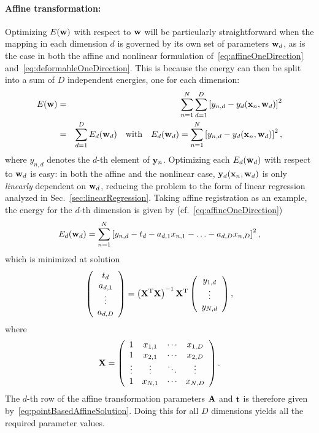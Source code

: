 \documentclass[10pt,twoside]{book}
\begin{document}
\paragraph{Affine transformation:}
%
Optimizing $E(\mathbf{w})$ with respect to $\mathbf{w}$ will be particularly straightforward when the mapping in each dimension $d$ is governed by its own set of parameters $\mathbf{w}_d$,
as is the case in both the affine and nonlinear formulation of~\eqref{eq:affineOneDirection} and~\eqref{eq:deformableOneDirection}.
This is because the energy can then be split into a sum of $D$ independent energies, one for each dimension: 
\begin{eqnarray*}
E( \mathbf{w} ) 
& = & 
\sum_{n=1}^N 
\sum_{d=1}^D
\left[ y_{n,d} - y_d( \mathbf{x}_n, \mathbf{w}_d ) \right]^2 
\\
& = & 
\sum_{d=1}^D E_d( \mathbf{w}_d )
\quad
\text{with}
\quad
E_d( \mathbf{w}_d )
=
\sum_{n=1}^N 
\left[ y_{n,d} - y_d( \mathbf{x}_n, \mathbf{w}_d ) \right]^2
,
\end{eqnarray*}
where $y_{n,d}$ denotes the $d$-th element of $\mathbf{y}_n$.
%
Optimizing each $E_d(\mathbf{w}_d)$ with respect to $\mathbf{w}_d$ is easy: 
in both the affine and the nonlinear case, 
$\mathbf{y}_d( \mathbf{x}_n, \mathbf{w}_d )$ is only \emph{linearly} dependent on $\mathbf{w}_d$,
reducing the problem to the form of linear regression analyzed in Sec.~\ref{sec:linearRegression}.
%
Taking affine registration as an example, the energy for the $d$-th dimension is given by (cf.~\eqref{eq:affineOneDirection}) 
$$
E_d(\mathbf{w}_d) = 
\sum_{n=1}^N 
\left[ y_{n,d} - t_d - a_{d,1} x_{n,1} - \ldots - a_{d,D} x_{n,D} \right]^2
,
$$
which is minimized at solution
\begin{equation}
\left( 
\begin{array}{c}
t_d \\
a_{d,1} \\
\vdots \\
a_{d,D}
\end{array}
\right)
=
\left( \mathbf{X}^\mathrm{T} \mathbf{X} \right)^{-1} \mathbf{X}^\mathrm{T} 
\left(
\begin{array}{c}
y_{1,d} \\
\vdots \\
y_{N,d}
\end{array}
\right)
,
\label{eq:pointBasedAffineSolution}
\end{equation}
where
$$
\mathbf{X} =
\left(
\begin{array}{cccc}
1      & x_{1,1} & \cdots & x_{1,D} \\ 
1      & x_{2,1} & \cdots & x_{2,D} \\ 
\vdots & \vdots  & \ddots & \vdots  \\
1      & x_{N,1} & \cdots & x_{N,D}
\end{array}
\right)
.
$$
%
The $d$-th row of the affine transformation parameters $\mathbf{A}$ and $\mathbf{t}$ is therefore given by~\eqref{eq:pointBasedAffineSolution}. 
Doing this for all $D$ dimensions yields all the required parameter values.
\end{document}
